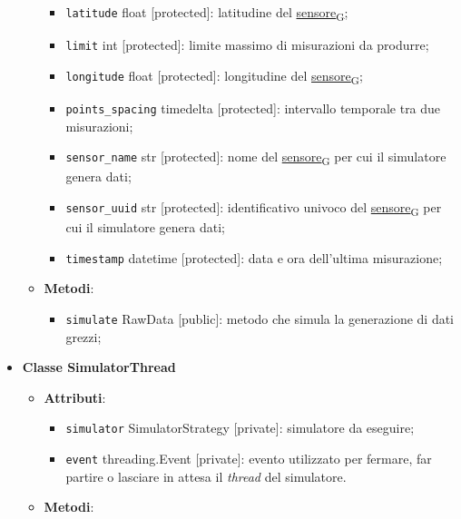 \begin{itemize}
\begin{itemize}
\begin{itemize}
			            \item \texttt{latitude} float [protected]: latitudine del \href{https://7last.github.io/docs/pb/documentazione-interna/glossario\#sensore}{sensore\textsubscript{G}};
			            \item \texttt{limit} int [protected]: limite massimo di misurazioni da produrre;
			            \item \texttt{longitude} float [protected]: longitudine del \href{https://7last.github.io/docs/pb/documentazione-interna/glossario\#sensore}{sensore\textsubscript{G}};
			            \item \texttt{points\_spacing} timedelta [protected]: intervallo temporale tra due misurazioni;
			            \item \texttt{sensor\_name} str [protected]: nome del \href{https://7last.github.io/docs/pb/documentazione-interna/glossario\#sensore}{sensore\textsubscript{G}} per cui il simulatore genera dati;
			            \item \texttt{sensor\_uuid} str [protected]: identificativo univoco del \href{https://7last.github.io/docs/pb/documentazione-interna/glossario\#sensore}{sensore\textsubscript{G}} per cui il simulatore genera dati;
			            \item \texttt{timestamp} datetime [protected]: data e ora dell'ultima misurazione;
		            \end{itemize}
		      \item \textbf{Metodi}:
		            \begin{itemize}
			            \item \texttt{simulate} RawData [public]: metodo che simula la generazione di dati grezzi;
		            \end{itemize}
	      \end{itemize}
	\item \textbf{Classe SimulatorThread}
	      \begin{itemize}
		      \item \textbf{Attributi}:
		            \begin{itemize}
			            \item \texttt{simulator} SimulatorStrategy [private]: simulatore da eseguire;
			            \item \texttt{event} threading.Event [private]: evento utilizzato per fermare, far partire o lasciare in attesa il \textit{thread} del simulatore.
		            \end{itemize}
		      \item \textbf{Metodi}:

\end{itemize}
\end{itemize}
